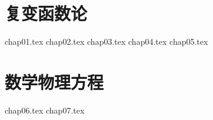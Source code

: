 \documentclass[
]{ctexbook}
\begin{document}


\setcounter{secnumdepth}{4}
\setcounter{tocdepth}{4}
\tableofcontents
% 


% 
% 

% 
% 
% 
\part{复变函数论}

{chap01.tex}
{chap02.tex}
{chap03.tex}
{chap04.tex}
{chap05.tex}

\part{数学物理方程}

{chap06.tex}
{chap07.tex}
\end{document}
